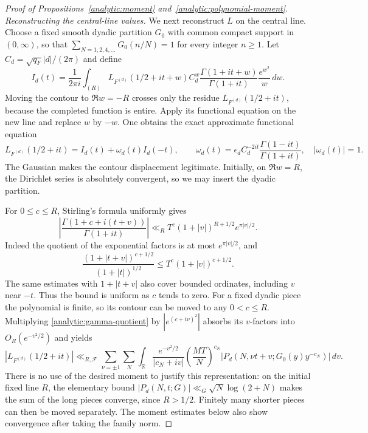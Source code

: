 \begin{proof}[Proof of Propositions~\ref{analytic:moment} and~\ref{analytic:polynomial-moment}]
\smallskip
\noindent\emph{Reconstructing the central-line values.}
We next reconstruct $L$ on the central line. Choose a fixed \mbox{smooth}
dyadic partition $G_0$ with common compact support in $(0,\infty)$,
so that
$\sum_{N=1,2,4,\ldots}G_0(n/N)=1$ for every integer $n\geq1$.
Let $C_d=\sqrt{q_F}|d|/(2\pi)$ and define
\[
 I_d(t)=\frac1{2\pi i}\int_{(R)}
 L_{F^{(d)}}(1/2+it+w)C_d^w
 \frac{\Gamma(1+it+w)}{\Gamma(1+it)}\frac{e^{w^2}}w\,dw.
\]
Moving the contour to $\Re w=-R$ crosses only the residue
$L_{F^{(d)}}(1/2+it)$, because the completed function is entire.
Apply its functional equation on the new line and replace $w$ by
$-w$. One obtains the exact approximate functional equation
\begin{equation}\label{analytic:afe-identity}
 L_{F^{(d)}}(1/2+it)=I_d(t)+\omega_d(t)I_d(-t),\qquad
 \omega_d(t)=\epsilon_d C_d^{-2it}
                       \frac{\Gamma(1-it)}{\Gamma(1+it)},
 \quad |\omega_d(t)|=1.
\end{equation}
The Gaussian makes the contour displacement legitimate. Initially,
on $\Re w=R$, the Dirichlet series is absolutely convergent, so we
may insert the dyadic partition.

For $0\leq c\leq R$, Stirling's formula uniformly gives
\begin{equation}\label{analytic:gamma-quotient}
 \left|\frac{\Gamma(1+c+i(t+v))}{\Gamma(1+it)}\right|
 \ll_R T^c(1+|v|)^{R+1/2}e^{\pi|v|/2}.
\end{equation}
Indeed the quotient of the exponential factors is at most
$e^{\pi|v|/2}$, and
\[
 \frac{(1+|t+v|)^{c+1/2}}{(1+|t|)^{1/2}}
 \leq T^c(1+|v|)^{c+1/2}.
\]
The same estimates with $1+|t+v|$ also cover bounded ordinates, including
$v$ near $-t$. Thus the bound is uniform as $c$ tends to zero.
For a fixed dyadic piece the polynomial is finite, so its contour can
be moved to any $0<c\leq R$. Multiplying
\eqref{analytic:gamma-quotient} by $|e^{(c+iv)^2}|$ absorbs its
$v$-factors into $O_R(e^{-v^2/2})$ and yields
\begin{equation}\label{analytic:afe-pieces}
 |L_{F^{(d)}}(1/2+it)|
 \ll_{R,\mathcal F}\sum_{\nu=\pm1}\sum_N
 \int_{\mathbb R}\frac{e^{-v^2/2}}{|c_N+iv|}
      \left(\frac{MT}N\right)^{c_N}
 |P_d(N,\nu t+v;G_0(y)y^{-c_N})|\,dv.
\end{equation}
There is no use of the desired moment to justify this representation:
on the initial fixed line $R$, the elementary bound
$|P_d(N,t;G)|\ll_G\sqrt N\log(2+N)$ makes the sum of the long
pieces converge, since $R>1/2$. Finitely many shorter pieces can
then be moved separately. The moment estimates below also show
convergence after taking the family norm.


\end{proof}
